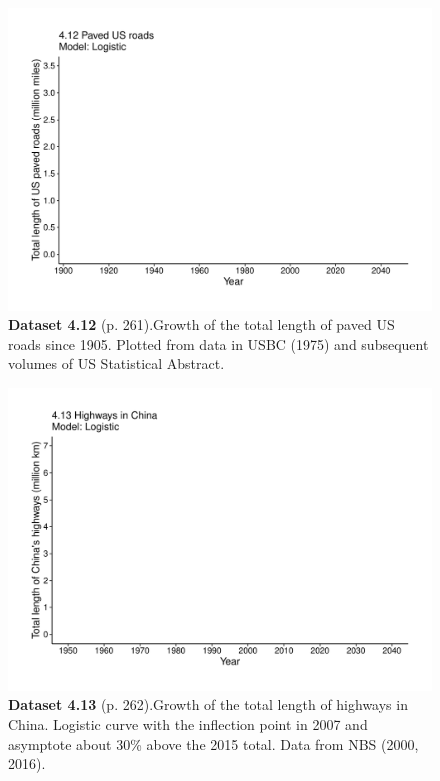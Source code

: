 \documentclass[aps,rmp,preprint,superscriptaddress,10pt,onecolumn]{article}
\begin{document}
\clearpage
\begin{figure}[h]
\includegraphics[width=\textwidth]{output/figs-ggplot/4.12.pdf}
\caption*{\textbf{Dataset 4.12} (p. 261).Growth of the total length of paved US roads since 1905. Plotted from data in USBC (1975) and subsequent volumes of US Statistical Abstract.}
\end{figure}
	
\clearpage
\begin{figure}[h]
\includegraphics[width=\textwidth]{output/figs-ggplot/4.13.pdf}
\caption*{\textbf{Dataset 4.13} (p. 262).Growth of the total length of highways in China. Logistic curve with the inflection point in 2007 and asymptote about 30\% above the 2015 total. Data from NBS (2000, 2016).}
\end{figure}
	
\end{document}
